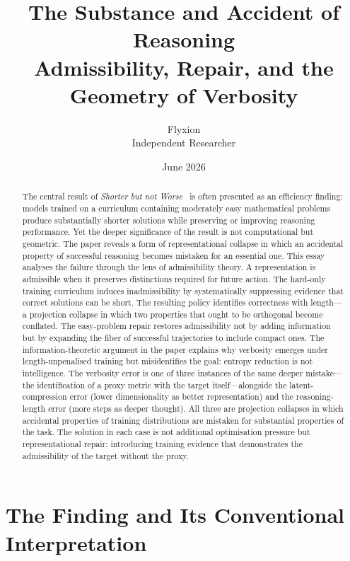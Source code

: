 \documentclass[11pt]{article}
\title{\textbf{The Substance and Accident of Reasoning}\\[6pt]
\large Admissibility, Repair, and the Geometry of Verbosity}
\author{Flyxion\\[4pt]
\small Independent Researcher}
\date{June 2026}
\theoremstyle{rthm}
\theoremstyle{rdef}
\theoremstyle{remark}
\begin{document}
\maketitle
\thispagestyle{empty}

\begin{abstract}
\noindent
The central result of \textit{Shorter but not Worse}~\cite{bounhar2026}
is often presented as an efficiency finding: models trained on a curriculum
containing moderately easy mathematical problems produce substantially
shorter solutions while preserving or improving reasoning performance.
Yet the deeper significance of the result is not computational but geometric.
The paper reveals a form of representational collapse in which an accidental
property of successful reasoning becomes mistaken for an essential one.
This essay analyses the failure through the lens of admissibility theory.
A representation is admissible when it preserves distinctions required for
future action. The hard-only training curriculum induces inadmissibility
by systematically suppressing evidence that correct solutions can be short.
The resulting policy identifies correctness with length---a projection
collapse in which two properties that ought to be orthogonal become
conflated. The easy-problem repair restores admissibility not by adding
information but by expanding the fiber of successful trajectories to
include compact ones. The information-theoretic argument in the paper
explains why verbosity emerges under length-unpenalised training but
misidentifies the goal: entropy reduction is not intelligence. The verbosity
error is one of three instances of the same deeper mistake---the
identification of a proxy metric with the target itself---alongside
the latent-compression error (lower dimensionality as better
representation) and the reasoning-length error (more steps as
deeper thought). All three are projection collapses in which
accidental properties of training distributions are mistaken for
substantial properties of the task. The solution in each case is
not additional optimisation pressure but representational repair:
introducing training evidence that demonstrates the admissibility
of the target without the proxy.
\end{abstract}

\newpage
\setcounter{page}{1}

\section{The Finding and Its Conventional Interpretation}
\label{sec:finding}
\end{document}
